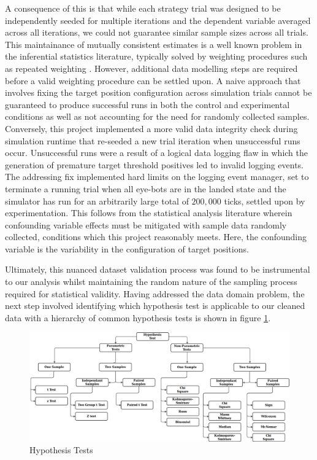 \documentclass{report}
\begin{document}
 A consequence of this is that while each strategy trial was designed to be independently seeded for multiple iterations and the dependent variable averaged across all iterations, we could not guarantee similar sample sizes across all trials. This maintainance of mutually consistent estimates is a well known problem in the inferential statistics literature, typically solved by weighting procedures \cite{Kalton2003} \cite{Boonstra2004} such as repeated weighting \cite{Renssen2001}. However, additional data modelling steps are required before a valid weighting procedure can be settled upon. A naive approach that involves fixing the target position configuration across simulation trials cannot be guaranteed to produce successful runs in both the control and experimental conditions as well as not accounting for the need for randomly collected samples. Conversely, this project implemented a more valid data integrity check during simulation runtime that re-seeded a new trial iteration when unsuccessful runs occur. Unsuccessful runs were a result of a logical data logging flaw in which the generation of premature target threshold positives led to invalid logging events. The addressing fix implemented hard limits on the logging event manager, set to terminate a running trial when all eye-bots are in the landed state and the simulator has run for an arbitrarily large total of $200,000$ ticks, settled upon by experimentation. This follows from the statistical analysis literature wherein confounding variable effects must be mitigated with sample data randomly collected, conditions which this project reasonably meets. Here, the confounding variable is the variability in the configuration of target positions.

Ultimately, this nuanced dataset validation process was found to be instrumental to our analysis whilst maintaining the random nature of the sampling process required for statistical validity. Having addressed the data domain problem, the next step involved identifying which hypothesis test is applicable to our cleaned data with a hierarchy of common hypothesis tests is shown in figure \ref{fig:hyp_tests}.

\begin{figure}[h]
	\centering
	\includegraphics[width=\textwidth]{images/HypothesisTest}
	\caption{Hypothesis Tests}
	\label{fig:hyp_tests}
\end{figure}
\end{document}
